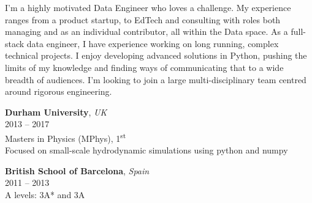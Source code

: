 \documentclass[a4paper]{limecv}
\begin{document}
  
  \begin{cvSidebar}
   

    \begin{cvContact}
    \end{cvContact}
  
    \begin{cvProfile}
      \begin{flushleft}
      I'm a highly motivated Data Engineer who loves a challenge. My experience ranges from a product startup,
      to EdTech and consulting with roles both managing and as an individual contributor, all within the Data space.
      As a full-stack data engineer, I have experience working on long running, complex technical 
      projects. I enjoy developing advanced solutions in Python, pushing the limits of my knowledge and finding ways of 
      communicating that to a wide breadth of audiences. I'm looking to join a large multi-disciplinary team 
      centred around rigorous engineering.
      \end{flushleft}
    \end{cvProfile}

    \begin{cvEducationSide}
      \begin{flushleft}
      \textbf{Durham University}, \textit{UK}\\
      \vspace{0.1cm}
      2013 -- 2017\\
      \vspace{0.1cm} 
      Masters in Physics (MPhys), 1\textsuperscript{st}\\
      \vspace{0.1cm} 
      Focused on small-scale hydrodynamic simulations using python and numpy

      \vspace{0.3cm} 
      \textbf{British School of Barcelona}, \textit{Spain}\\
      \vspace{0.1cm}
      2011 -- 2013\\
      \vspace{0.1cm}
      A levels: 3A* and 3A
      \end{flushleft}
    \end{cvEducationSide}

    \begin{cvLanguages}
    \end{cvLanguages}
    
  \end{cvSidebar}
\end{document}
